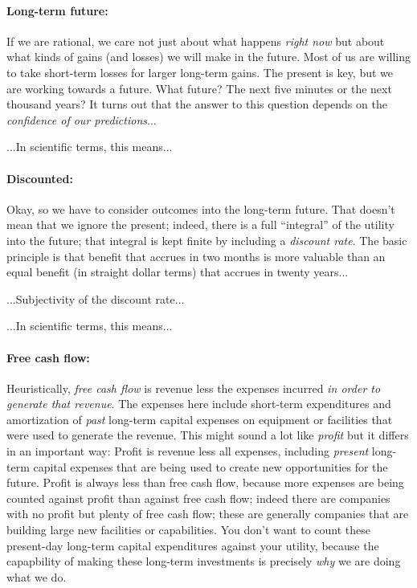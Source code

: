 \documentclass[12pt,twoside,pdftex]{article}
\begin{document}
\paragraph{Long-term future:}
If we are rational, we care not just about what happens \emph{right
now} but about what kinds of gains (and losses) we will make in the
future.  Most of us are willing to take short-term losses for larger
long-term gains.  The present is key, but we are working towards a
future.  What future?  The next five minutes or the next thousand
years?  It turns out that the answer to this question depends on the
\emph{confidence of our predictions}...

...In scientific terms, this means...

\paragraph{Discounted:}
Okay, so we have to consider outcomes into the long-term future.  That
doesn't mean that we ignore the present; indeed, there is a full
``integral'' of the utility into the future; that integral is kept
finite by including a \emph{discount rate}.  The basic principle is
that benefit that accrues in two months is more valuable than an equal
benefit (in straight dollar terms) that accrues in twenty years...

...Subjectivity of the discount rate...

...In scientific terms, this means...

\paragraph{Free cash flow:}
Heuristically, \emph{free cash flow} is revenue less the expenses
incurred \emph{in order to generate that revenue}.  The expenses here
include short-term expenditures and amortization of \emph{past}
long-term capital expenses on equipment or facilities that were used
to generate the revenue.  This might sound a lot like \emph{profit}
but it differs in an important way: Profit is revenue less all
expenses, including \emph{present} long-term capital expenses that are
being used to create new opportunities for the future.  Profit is
always less than free cash flow, because more expenses are being
counted against profit than against free cash flow; indeed there are
companies with no profit but plenty of free cash flow; these are
generally companies that are building large new facilities or
capabilities.  You don't want to count these present-day long-term
capital expenditures against your utility, because the capapbility of
making these long-term investments is precisely \emph{why} we are
doing what we do.
\end{document}
